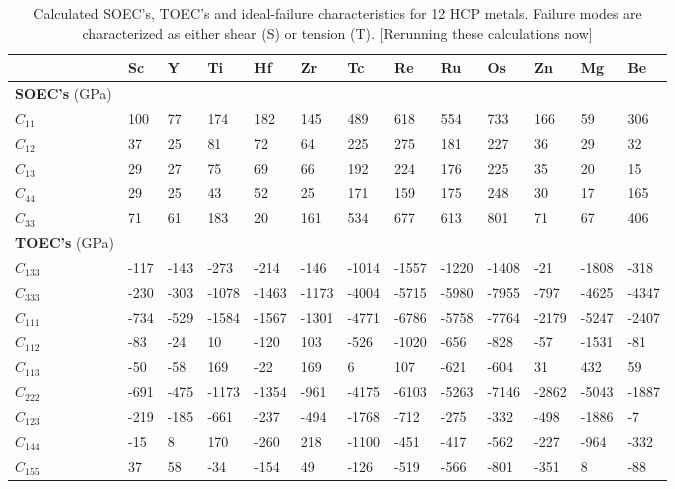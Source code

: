 \documentclass[showpacs,aps,floatfix,prb,reprint,superscriptaddress]{revtex4-1}
\begin{document}
\begin{table*}
\caption{\label{tab:Re_properties_total} Calculated SOEC's, TOEC's and ideal-failure characteristics for 12 HCP metals. Failure modes are characterized as either shear (S) or tension (T). [Rerunning these calculations now]}
\begin{ruledtabular}
\begin{tabular}{l l l l l l l l l l l l l}
 & Sc & Y & Ti & Hf & Zr & Tc & Re & Ru & Os & Zn & Mg & Be \\
\hline
\textbf{SOEC's} (GPa) & & & & & & & & & & & & \\
$C_{11}$ & 100 & 77 & 174 & 182 & 145 & 489 & 618 & 554 & 733 & 166 & 59 & 306 \\
$C_{12}$ & 37 & 25 & 81 & 72    & 64  & 225 & 275 & 181 & 227 & 36  & 29 & 32 \\
$C_{13}$ & 29 & 27 & 75 & 69    & 66  & 192 & 224 & 176 & 225 & 35  & 20 & 15 \\
$C_{44}$ & 29 & 25 & 43 & 52    & 25  & 171 & 159 & 175 & 248 & 30  & 17 & 165 \\
$C_{33}$ & 71 & 61 & 183 & 20   & 161 & 534 & 677 & 613 & 801 & 71  & 67 & 406 \\
\hline
\textbf{TOEC's} (GPa) & & & & & & & & & & & & \\
$C_{133}$ & -117 & -143   & -273  & -214  & -146  & -1014 & -1557 & -1220 & -1408 &  -21 &  -1808 & -318 \\
$C_{333}$ & -230 & -303   & -1078 & -1463 & -1173 & -4004 & -5715 & -5980 & -7955 &  -797 &  -4625 & -4347 \\
$C_{111}$ & -734 & -529   & -1584 & -1567 & -1301 & -4771 & -6786 & -5758 & -7764 &  -2179 &  -5247 & -2407 \\
$C_{112}$ & -83 & -24     &  10   & -120  & 103   & -526  & -1020 & -656 & -828 &  -57 &  -1531 & -81 \\
$C_{113}$ & -50 & -58     & 169   & -22   & 169   & 6     & 107   & -621 & -604 &  31 &  432 & 59 \\
$C_{222}$ & -691 & -475   & -1173 & -1354 & -961  & -4175 & -6103 & -5263 & -7146 &  -2862 & -5043 & -1887 \\
$C_{123}$ & -219 & -185   & -661  & -237  & -494  & -1768 & -712  & -275 & -332 &  -498 &  -1886 & -7 \\
$C_{144}$ & -15 & 8       & 170   & -260  & 218   & -1100 & -451  & -417 & -562 &  -227 &  -964 & -332 \\
$C_{155}$ & 37 & 58       & -34   & -154  & 49    & -126  & -519  & -566 & -801 &  -351 & 8 & -88 \\

\end{tabular}
\end{ruledtabular}
\end{table*}
\end{document}
